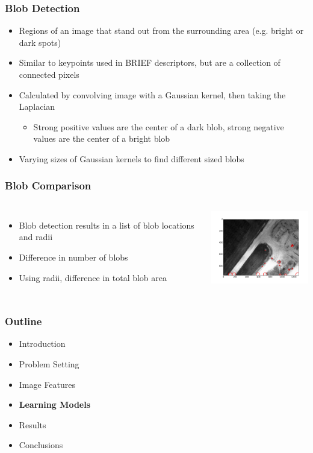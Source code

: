 \documentclass{beamer}
\begin{document}
\begin{frame}
\frametitle{Blob Detection}
\begin{itemize}
  \item Regions of an image that stand out from the surrounding area (e.g. bright or dark spots)
  \item Similar to keypoints used in BRIEF descriptors, but are a collection of connected pixels
  \item Calculated by convolving image with a Gaussian kernel, then taking the Laplacian
  \begin{itemize}
    \item Strong positive values are the center of a dark blob, strong negative values are the center of a bright blob
  \end{itemize}
  \item Varying sizes of Gaussian kernels to find different sized blobs
\end{itemize}
\end{frame}


\begin{frame}
\frametitle{Blob Comparison}
\begin{columns}
  \begin{itemize}
    \item Blob detection results in a list of blob locations and radii
    \item Difference in number of blobs
    \item Using radii, difference in total blob area
  \end{itemize}
  \includegraphics[width = 5cm]{Figures/blobtest}
\end{columns}
\end{frame}


\begin{frame}
\frametitle{Outline}
\begin{itemize}
  \item Introduction
  \item\vspace{0.5cm}Problem Setting
  \item\vspace{0.5cm}Image Features
  \item \vspace{0.5cm} \textbf{Learning Models}
  \item \vspace{0.5cm} Results
  \item \vspace{0.5cm}Conclusions
\end{itemize}
\end{frame}
\end{document}

